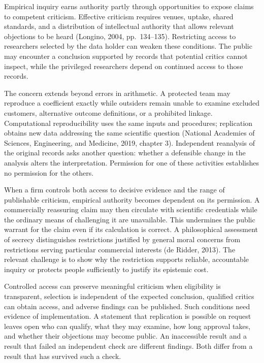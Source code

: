 \noindent \noindent Empirical inquiry earns authority partly through opportunities
to expose claims to competent criticism. Effective criticism requires
venues, uptake, shared standards, and a distribution of intellectual
authority that allows relevant objections to be heard (Longino, 2004,
pp.~134--135). Restricting access to researchers selected by the data
holder can weaken these conditions. The public may encounter a
conclusion supported by records that potential critics cannot inspect,
while the privileged researchers depend on continued access to those
records.

The concern extends beyond errors in arithmetic. A protected team may
reproduce a coefficient exactly while outsiders remain unable to examine
excluded customers, alternative outcome definitions, or a prohibited
linkage. Computational reproducibility uses the same inputs and
procedures; replication obtains new data addressing the same scientific
question (National Academies of Sciences, Engineering, and Medicine,
2019, chapter 3). Independent reanalysis of the original records asks
another question: whether a defensible change in the analysis alters the
interpretation. Permission for one of these activities establishes no
permission for the others.

When a firm controls both access to decisive evidence and the range of
publishable criticism, empirical authority becomes dependent on its
permission. A commercially reassuring claim may then circulate with
scientific credentials while the ordinary means of challenging it are
unavailable. This undermines the public warrant for the claim even if
its calculation is correct. A philosophical assessment of secrecy
distinguishes restrictions justified by general moral concerns from
restrictions serving particular commercial interests (de Ridder, 2013).
The relevant challenge is to show why the restriction supports reliable,
accountable inquiry or protects people sufficiently to justify its
epistemic cost.

Controlled access can preserve meaningful criticism when eligibility is
transparent, selection is independent of the expected conclusion,
qualified critics can obtain access, and adverse findings can be
published. Such conditions need evidence of implementation. A statement
that replication is possible on request leaves open who can qualify,
what they may examine, how long approval takes, and whether their
objections may become public. An inaccessible result and a result that
failed an independent check are different findings. Both differ from a
result that has survived such a check.

